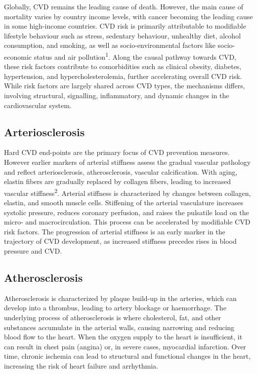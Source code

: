 \documentclass[
  a4paper,
  headsepline=true,
  open=any]{scrbook}
\begin{document}
Globally, CVD remains the leading cause of death. However, the main
cause of mortality varies by country income levels, with cancer becoming
the leading cause in some high-income countries. CVD risk is primarily
attributable to modifiable lifestyle behaviour such as stress, sedentary
behaviour, unhealthy diet, alcohol consumption, and smoking, as well as
socio-environmental factors like socio-economic status and air
pollution\textsuperscript{1}. Along the causal pathway towards CVD,
these risk factors contribute to comorbidities such as clinical obesity,
diabetes, hypertension, and hypercholesterolemia, further accelerating
overall CVD risk. While risk factors are largely shared across CVD
types, the mechanisms differs, involving structural, signalling,
inflammatory, and dynamic changes in the cardiovascular system.

\hypertarget{arteriosclerosis}{%
\subsection{Arteriosclerosis}\label{arteriosclerosis}}

Hard CVD end-points are the primary focus of CVD prevention measures.
However earlier markers of arterial stiffness assess the gradual
vascular pathology and reflect arteriosclerosis, atherosclerosis,
vascular calcification. With aging, elastin fibers are gradually
replaced by collagen fibers, leading to increased vascular
stiffness\textsuperscript{2}. Arterial stiffness is characterized by
changes between collagen, elastin, and smooth muscle cells. Stiffening
of the arterial vasculature increases systolic pressure, reduces
coronary perfusion, and raises the pulsatile load on the micro- and
macrocirculation. This process can be accelerated by modifiable CVD risk
factors. The progression of arterial stiffness is an early marker in the
trajectory of CVD development, as increased stiffness precedes rises in
blood pressure and CVD.

\hypertarget{atherosclerosis}{%
\subsection{Atherosclerosis}\label{atherosclerosis}}

Atherosclerosis is characterized by plaque build-up in the arteries,
which can develop into a thrombus, leading to artery blockage or
haemorrhage. The underlying process of atherosclerosis is where
cholesterol, fat, and other substances accumulate in the arterial walls,
causing narrowing and reducing blood flow to the heart. When the oxygen
supply to the heart is insufficient, it can result in chest pain
(angina) or, in severe cases, myocardial infarction. Over time, chronic
ischemia can lead to structural and functional changes in the heart,
increasing the risk of heart failure and arrhythmia.
\end{document}
